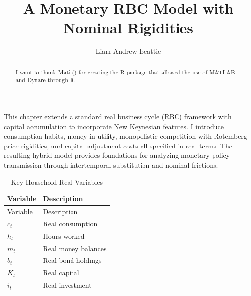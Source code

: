 \documentclass[11pt,preprint]{elsarticle}
\numberwithin{equation}{section}
\numberwithin{figure}{section}
\numberwithin{table}{section}
\begin{document}
\begin{frontmatter}  %

\title{A Monetary RBC Model with Nominal Rigidities}





\author[Add1]{Liam Andrew Beattie}





\address[Add1]{Macroeconomics 871, Stellenbosch University, South
Africa}


\begin{abstract}
\small{
I want to thank Mati () for creating the R
package that allowed the use of MATLAB and Dynare through R. \textbar{}
}
\end{abstract}

\vspace{1cm}





\vspace{0.5cm}

\end{frontmatter}

\setcounter{footnote}{0}



\pagestyle{fancy}
\chead{}
\rhead{}
\lfoot{}
\lhead{}
\cfoot{}


\headsep 35pt %




This chapter extends a standard real business cycle (RBC) framework with
capital accumulation to incorporate New Keynesian features. I introduce
consumption habits, money-in-utility, monopolistic competition with
Rotemberg price rigidities, and capital adjustment costs-all specified
in real terms. The resulting hybrid model provides foundations for
analyzing monetary policy transmission through intertemporal
substitution and nominal frictions.

\begin{longtable}[]{@{}ll@{}}
\caption{Key Household Real Variables}\tabularnewline
\toprule\noalign{}
Variable & Description \\
\midrule\noalign{}
\endfirsthead
\toprule\noalign{}
Variable & Description \\
\midrule\noalign{}
\endhead
\bottomrule\noalign{}
\endlastfoot
\(c_t\) & Real consumption \\
\(h_t\) & Hours worked \\
\(m_t\) & Real money balances \\
\(b_t\) & Real bond holdings \\
\(K_t\) & Real capital \\
\(i_t\) & Real investment \\
\end{longtable}
\end{document}
